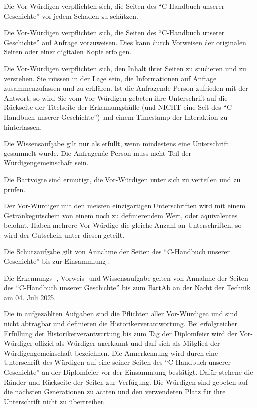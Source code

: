 \documentclass[fontsize=12pt,parskip=half]{scrartcl}
\begin{document}
\begin{contract}
  \SubClause[title={Schutzaufgabe}]\label{H.schutzaufgabe}
  Die Vor-Würdigen verpflichten sich, die Seiten des ``C-Handbuch unserer Geschichte'' vor jedem Schaden zu schützen.

  \SubClause[title={Vorweisaufgabe}]\label{H.vorweisaufgabe}
  Die Vor-Würdigen verpflichten sich, die Seiten des ``C-Handbuch unserer Geschichte'' auf Anfrage vorzuweisen. Dies kann durch Vorweisen der originalen
  Seiten oder einer digitalen Kopie erfolgen.

  \SubClause[title={Wissensaufgabe}]\label{H.wissensaufgabe}
  Die Vor-Würdigen verpflichten sich, den Inhalt ihrer Seiten zu studieren und zu verstehen. Sie müssen in der Lage sein, die Informationen
  auf Anfrage zusammenzufassen und zu erklären. Ist die Anfragende Person zufrieden mit der Antwort, so wird Sie vom Vor-Würdigen gebeten
  ihre Unterschrift auf die Rückseite der Titelseite der Erkennungshülle (und NICHT eine Seit des ``C-Handbuch unserer Geschichte'') und einem
  Timestamp der Interaktion zu hinterlassen.

  Die Wissensaufgabe gilt nur als erfüllt, wenn mindestens eine Unterschrift gesammelt wurde. Die Anfragende Person muss nicht Teil der Würdigengemeinschaft sein.

  Die Bartvögte sind ermutigt, die Vor-Würdigen unter sich zu verteilen und zu prüfen.

  Der Vor-Würdiger mit den meisten einzigartigen Unterschriften wird mit einem Getränkegutschein von einem noch zu definierendem Wert, oder äquivalentes
  belohnt. Haben mehrere Vor-Würdige die gleiche Anzahl an Unterschriften, so wird der Gutschein unter diesen geteilt.

  \SubClause[title={Dauer}]
  Die Schutzaufgabe  gilt von Annahme der Seiten des ``C-Handbuch unserer Geschichte'' bis zur Einsammlung .

  Die Erkennungs- , Vorweis-  und Wissensaufgabe  gelten von Annahme der Seiten
  des ``C-Handbuch unserer Geschichte'' bis zum BartAb an der Nacht der Technik am 04. Juli 2025.

  \Clause[title={Historikerverantwortung}]\label{H.verantwortung}
  Die in  aufgezählten Aufgaben sind die Pflichten aller Vor-Würdigen und sind nicht abtragbar und definieren die Historikerverantwortung.
  Bei erfolgreicher Erfüllung der Historikerverantwortung bis zum Tag der Diplomfeier wird der Vor-Würdiger offiziel als Würdiger anerkannt und darf sich
  als Mitglied der Würdigengemeinschaft bezeichnen. Die Annerkennung wird durch eine Unterschrift des Würdigen auf eine seiner Seiten des ``C-Handbuch unserer Geschichte''
  an der Diplomfeier vor der Einsammlung  bestätigt. Dafür stehene die Ränder und Rückseite der Seiten zur Verfügung. Die Würdigen sind
  gebeten auf die nächsten Generationen zu achten und den verwendeten Platz für ihre Unterschrift nicht zu übertreiben.


\end{contract}
\end{document}
